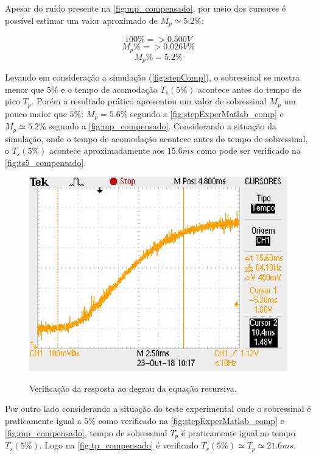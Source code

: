 \documentclass[
	article,			%
	11pt,				%
	oneside,			%
	a4paper,			%
	english,			%
	brazil,				%
	sumario=tradicional
	]{abntex2}
\begin{document}
Apesar do ruído presente na \autoref{fig:mp_compensado}, por meio dos cursores é possível estimar um valor aproximado de $M_p \simeq 5.2\%$:

$$
	100\% => 0.500 V
$$
$$
	M_p\% => 0.026 V\%
$$
$$
	M_p\% = 5.2\%
$$

\pagebreak

Levando em consideração a simulação (\autoref{fig:stepComp}), o sobressinal se mostra menor que $5\%$ e o tempo de acomodação $T_s (5\%)$ acontece antes do tempo de pico $T_p$. 
Porém a resultado prático apresentou um valor de sobressinal $M_p$ um pouco maior que $5\%$: $M_p = 5.6\%$ segundo a \autoref{fig:stepExperMatlab_comp} e $M_p \simeq 5.2\%$  segundo a \autoref{fig:mp_compensado}.
Considerando a situação da simulação, onde o tempo de acomodação acontece antes do tempo de sobressinal, o $T_s (5\%)$ acontece aproximadamente aos $15.6 ms$ como pode ser verificado na \autoref{fig:ts5_compensado}.

\begin{figure}[htb!]
	\centering
	\caption{Verificação da resposta ao degrau da equação recursiva.}
	\includegraphics[scale=1]{./img/ts5_compensado.JPG}
	\label{fig:ts5_compensado}
\end{figure}

Por outro lado considerando a situação do teste experimental onde o sobressinal é praticamente igual a $5\%$ como verificado na \autoref{fig:stepExperMatlab_comp} e \autoref{fig:mp_compensado}, tempo de sobressinal $T_p$ é praticamente igual ao tempo $T_s (5\%)$. 
Logo na \autoref{fig:tp_compensado} é verificado $T_s (5\%) \simeq  T_p \simeq 21.6 ms$.
\end{document}
